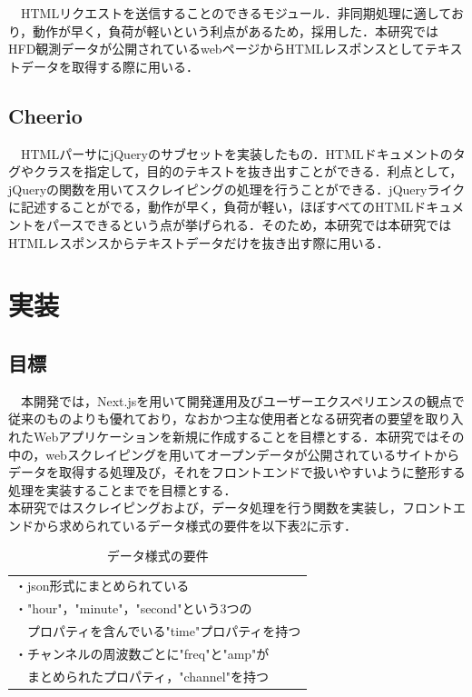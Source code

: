 　HTMLリクエストを送信することのできるモジュール．非同期処理に適しており，動作が早く，負荷が軽いという利点があるため，採用した．本研究ではHFD観測データが公開されているwebページからHTMLレスポンスとしてテキストデータを取得する際に用いる．\cite{superagent}
\subsection{Cheerio}

　HTMLパーサにjQueryのサブセットを実装したもの．HTMLドキュメントのタグやクラスを指定して，目的のテキストを抜き出すことができる．利点として，jQueryの関数を用いてスクレイピングの処理を行うことができる．jQueryライクに記述することがでる，動作が早く，負荷が軽い，ほぼすべてのHTMLドキュメントをパースできるという点が挙げられる．そのため，本研究では本研究ではHTMLレスポンスからテキストデータだけを抜き出す際に用いる．\cite{cheerio}
\section{実装}
\subsection{目標}
　本開発では，Next.jsを用いて開発運用及びユーザーエクスペリエンスの観点で従来のものよりも優れており，なおかつ主な使用者となる研究者の要望を取り入れたWebアプリケーションを新規に作成することを目標とする．本研究ではその中の，webスクレイピングを用いてオープンデータが公開されているサイトからデータを取得する処理及び，それをフロントエンドで扱いやすいように整形する処理を実装することまでを目標とする．\\
 本研究ではスクレイピングおよび，データ処理を行う関数を実装し，フロントエンドから求められているデータ様式の要件を以下表2に示す． \\
 \begin{table}[h]
  \centering
  \caption{データ様式の要件}
  \begin{tabular}{l}
  \toprule
     ・json形式にまとめられている\\
     ・"hour"，"minute"，"second"という3つの\\
     　プロパティを含んでいる"time"プロパティを持つ\\
     ・チャンネルの周波数ごとに"freq"と"amp"が\\
     　まとめられたプロパティ，"channel"を持つ\\
  \end{tabular}
\end{table}
